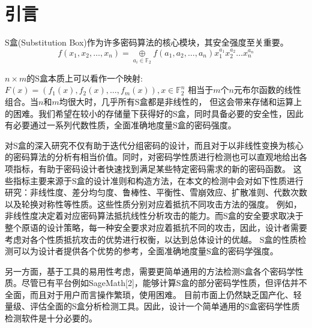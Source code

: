 \documentclass{xduugthesis}
\numberwithin{equation}{section}
\begin{document}
\frontmatter
\mainmatter
\chapter{引言}
S盒(Substitution Box)作为许多密码算法的核心模块，其安全强度至关重要。
\begin{equation}
    f(x_1,x_2,\dots ,x_n) = \mathop{\oplus}\limits_{a_i \in \mathbb{F}_2}f(a_1,a_2,\dots,a_n)x_1^{a_1}x_2^{a_2}\dots x_n^{a_n}
\end{equation}\par


$n\times m$的S盒本质上可以看作一个映射:$F(x) = (f_1(x), f_2(x),\dots , f_m(x)), x\in \mathbb{F}_2^n$
相当于$m$个$n$元布尔函数的线性组合。当$n$和$m$均很大时，几乎所有S盒都是非线性的，
但这会带来存储和运算上的困难。我们希望在较小的存储量下获得好的S盒，同时具备必要的安全性，因此有必要通过一系列代数性质，全面准确地度量S盒的密码强度。\par
对S盒的深入研究不仅有助于迭代分组密码的设计，而且对于以非线性变换为核心的密码算法的分析有相当价值。同时，对密码学性质进行检测也可以直观地给出各项指标，有助于密码设计者快速找到满足某些特定密码需求的新的密码函数。
这些指标主要来源于S盒的设计准则和构造方法，在本文的检测中会对如下性质进行研究：非线性度、差分均匀度、鲁棒性、平衡性、雪崩效应、扩散准则、代数次数以及轮换对称性等性质。这些性质分别对应着抵抗不同攻击方法的强度。
例如，非线性度决定着对应密码算法抵抗线性分析攻击的能力。而S盒的安全要求取决于整个原语的设计策略，每一种安全要求对应着抵抗不同的攻击，因此，设计者需要考虑对各个性质抵抗攻击的优势进行权衡，以达到总体设计的优越。
S盒的性质检测可以为设计者提供各个优势的参考，全面准确地度量S盒的密码学强度。\par
另一方面，基于工具的易用性考虑，需要更简单通用的方法检测S盒各个密码学性质。尽管已有平台例如SageMath[2]，能够计算S盒的部分密码学性质，但评估并不全面，而且对于用户而言操作繁琐，使用困难。
目前市面上仍然缺乏国产化、轻量级、评估全面的S盒分析检测工具。因此，设计一个简单通用的S盒密码学性质检测软件是十分必要的。\par
\end{document}
